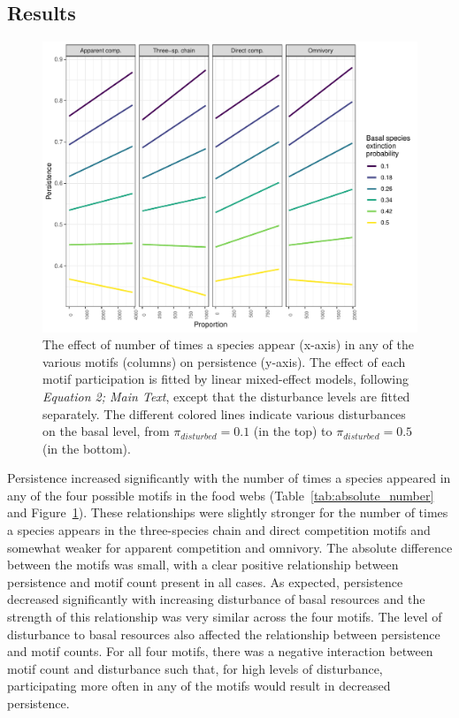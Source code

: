 \documentclass[12pt]{article}
\begin{document}
\begin{spacing}{2.0}
    \subsection*{Results}

        \begin{figure}[h!]
            \centering
            \includegraphics[width=\textwidth]{figures/absolute_lmer_allCS.pdf}
            \caption{The effect of number of times a species appear (x-axis) in any of the various motifs (columns) on persistence (y-axis). The effect of each motif participation is fitted by linear mixed-effect models, following \emph{Equation 2; Main Text}, except that the disturbance levels are fitted separately. The different colored lines indicate various disturbances on the basal level, from $\pi_{disturbed} = 0.1$ (in the top) to $\pi_{disturbed} = 0.5$ (in the bottom).}
            \label{fig:abs_lmer_all}
        \end{figure}            
    
    
        Persistence increased significantly with the number of times a species appeared in any of the four possible motifs in the food webs (Table~\ref{tab:absolute_number} and Figure~\ref{fig:abs_lmer_all}). 
        These relationships were slightly stronger for the number of times a species appears in the three-species chain and direct competition motifs and somewhat weaker for apparent competition and omnivory. The absolute difference between the motifs was small, with a clear positive relationship between persistence and motif count present in all cases. 
        As expected, persistence decreased significantly with increasing disturbance of basal resources and the strength of this relationship was very similar across the four motifs.
        The level of disturbance to basal resources also affected the relationship between persistence and motif counts.
        For all four motifs, there was a negative interaction between motif count and disturbance such that, for high levels of disturbance, participating more often in any of the motifs would result in decreased persistence.
    

\end{spacing}
\end{document}
